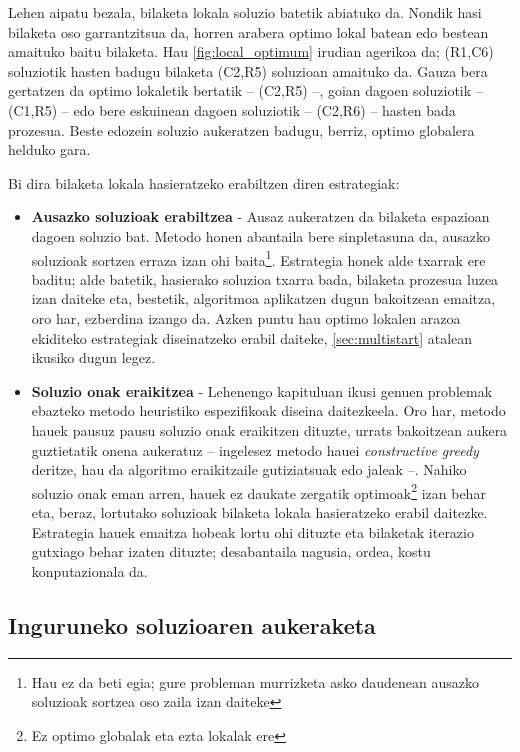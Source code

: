 \documentclass[eu]{ifirak}\usepackage[]{graphicx}\usepackage[]{color}
\begin{document}
Lehen aipatu bezala, bilaketa lokala soluzio batetik abiatuko da. Nondik hasi bilaketa oso garrantzitsua da, horren arabera optimo lokal batean edo bestean amaituko baitu bilaketa. Hau \ref{fig:local_optimum} irudian agerikoa da; (R1,C6) soluziotik hasten badugu bilaketa (C2,R5) soluzioan amaituko da. Gauza bera gertatzen da optimo lokaletik bertatik -- (C2,R5) --, goian dagoen soluziotik -- (C1,R5) -- edo bere eskuinean dagoen soluziotik -- (C2,R6) -- hasten bada prozesua. Beste edozein soluzio aukeratzen badugu, berriz, optimo globalera helduko gara. 

Bi dira bilaketa lokala hasieratzeko erabiltzen diren estrategiak:

\begin{itemize}
\item \textbf{Ausazko soluzioak erabiltzea} -  Ausaz aukeratzen da bilaketa espazioan dagoen soluzio bat. Metodo honen abantaila bere sinpletasuna da, ausazko soluzioak sortzea erraza izan ohi baita\footnote{Hau ez da beti egia; gure probleman murrizketa asko daudenean ausazko soluzioak sortzea oso zaila izan daiteke}. Estrategia honek alde txarrak ere baditu; alde batetik, hasierako soluzioa txarra bada, bilaketa prozesua luzea izan daiteke eta, bestetik, algoritmoa aplikatzen dugun bakoitzean emaitza, oro har, ezberdina izango da. Azken puntu hau optimo lokalen arazoa ekiditeko estrategiak diseinatzeko erabil daiteke, \ref{sec:multistart} atalean ikusiko dugun legez.
\item \textbf{Soluzio onak eraikitzea} - Lehenengo kapituluan ikusi genuen problemak ebazteko metodo heuristiko espezifikoak diseina daitezkeela. Oro har, metodo hauek pausuz pausu soluzio onak eraikitzen dituzte, urrats bakoitzean aukera guztietatik onena aukeratuz -- ingelesez metodo hauei \textit{constructive greedy} deritze, hau da algoritmo eraikitzaile gutiziatsuak edo jaleak --. Nahiko soluzio onak eman arren, hauek ez daukate zergatik optimoak\footnote{Ez optimo globalak eta ezta lokalak ere} izan behar eta, beraz, lortutako soluzioak bilaketa lokala hasieratzeko erabil daitezke. Estrategia hauek emaitza hobeak lortu ohi dituzte eta bilaketak iterazio gutxiago behar izaten dituzte; desabantaila nagusia, ordea, kostu konputazionala da.
\end{itemize}

\subsection{Inguruneko soluzioaren aukeraketa}
\end{document}
